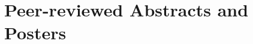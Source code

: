 \section*{Peer-reviewed Abstracts and Posters}

\begin{quote}
\end{quote}

\begin{quote}
\end{quote}

\begin{quote}
\end{quote}

\begin{quote}
\end{quote}





\cleardoublepage

